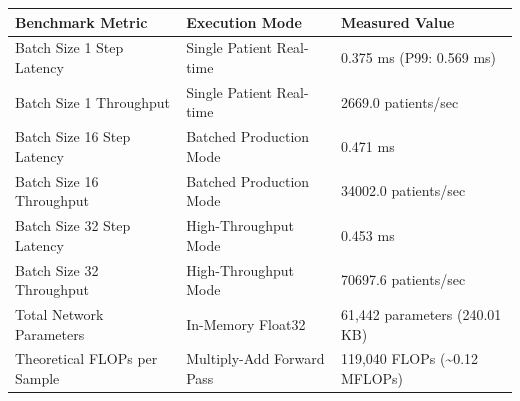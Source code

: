 \begin{tabular}{lll}
\toprule
Benchmark Metric & Execution Mode & Measured Value \\
\midrule
Batch Size 1 Step Latency & Single Patient Real-time & 0.375 ms (P99: 0.569 ms) \\
Batch Size 1 Throughput & Single Patient Real-time & 2669.0 patients/sec \\
Batch Size 16 Step Latency & Batched Production Mode & 0.471 ms \\
Batch Size 16 Throughput & Batched Production Mode & 34002.0 patients/sec \\
Batch Size 32 Step Latency & High-Throughput Mode & 0.453 ms \\
Batch Size 32 Throughput & High-Throughput Mode & 70697.6 patients/sec \\
Total Network Parameters & In-Memory Float32 & 61,442 parameters (240.01 KB) \\
Theoretical FLOPs per Sample & Multiply-Add Forward Pass & 119,040 FLOPs (\textasciitilde 0.12 MFLOPs) \\
\bottomrule
\end{tabular}
